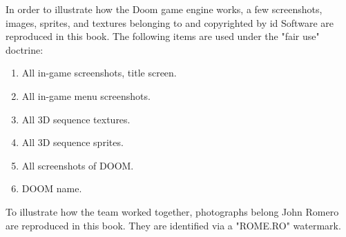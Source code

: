 In order to illustrate how the Doom game engine works, a few screenshots, images, sprites, and textures belonging to and copyrighted by id Software are reproduced in this book. The following items are used under the "fair use" doctrine:\\
\par
\begin{enumerate}
	\item All in-game screenshots, title screen.
	\item All in-game menu screenshots.
	\item All 3D sequence textures.
    \item All 3D sequence sprites.
    \item All screenshots of DOOM.
    \item DOOM name.
\end{enumerate}
\par
To illustrate how the team worked together, photographs belong John Romero are reproduced in this book. They are identified via a "ROME.RO" watermark.

